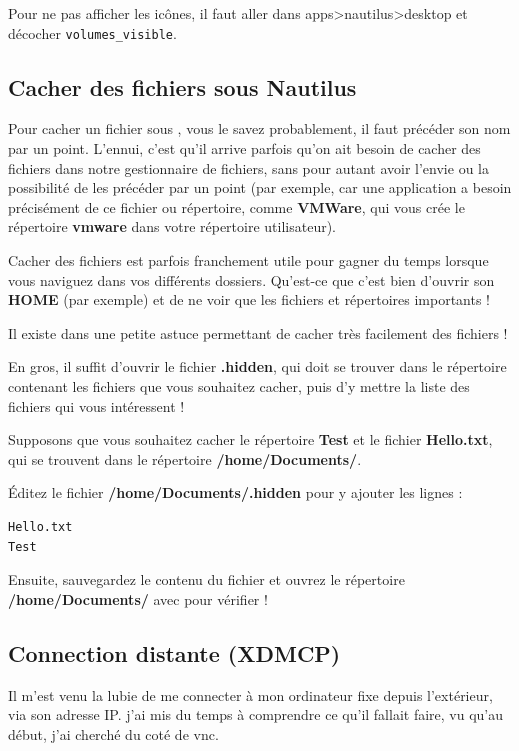 \documentclass[a4paper,twoside]{article}
\begin{document}
Pour ne pas afficher les icônes, il faut aller dans apps>nautilus>desktop et décocher \texttt{volumes\_visible}.

\subsection{Cacher des fichiers sous Nautilus}

Pour cacher un fichier sous , vous le savez probablement, il faut précéder son nom par un point. L'ennui, c'est qu'il arrive parfois qu'on ait besoin de cacher des fichiers dans notre gestionnaire de fichiers, sans pour autant avoir l'envie ou la possibilité de les précéder par un point (par exemple, car une application a besoin précisément de ce fichier ou répertoire, comme \textbf{VMWare}, qui vous crée le répertoire \textbf{vmware} dans votre répertoire utilisateur).

Cacher des fichiers est parfois franchement utile pour gagner du temps lorsque vous naviguez dans vos différents dossiers. Qu'est-ce que c'est bien d'ouvrir son \textbf{HOME} (par exemple) et de ne voir que les fichiers et répertoires importants !

Il existe dans  une petite astuce permettant de cacher très facilement des fichiers !

En gros, il suffit d'ouvrir le fichier \textbf{.hidden}, qui doit se trouver dans le répertoire contenant les fichiers que vous souhaitez cacher, puis d'y mettre la liste des fichiers qui vous intéressent !

Supposons que vous souhaitez cacher le répertoire \textbf{Test} et le fichier \textbf{Hello.txt}, qui se trouvent dans le répertoire \textbf{/home/Documents/}.

Éditez le fichier \textbf{/home/Documents/.hidden} pour y ajouter les lignes :
\begin{verbatim}
Hello.txt
Test
\end{verbatim}

Ensuite, sauvegardez le contenu du fichier et ouvrez le répertoire \textbf{/home/Documents/} avec  pour vérifier !

\subsection{Connection distante (XDMCP)}
Il m'est venu la lubie de me connecter à mon ordinateur fixe depuis l'extérieur, via son adresse IP. j'ai mis du temps à comprendre ce qu'il fallait faire, vu qu'au début, j'ai cherché du coté de vnc.
\end{document}
